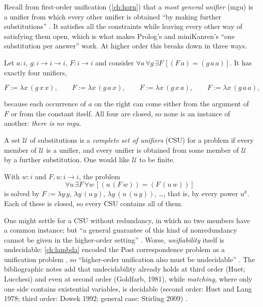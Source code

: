 Recall from first-order unification (\cref{ch:horn}) that a \emph{most general unifier} (mgu) is a unifier from
which every other unifier is obtained \enquote{by making further substitutions} . It satisfies all the
constraints while leaving every other way of satisfying them open, which is what makes Prolog's and
miniKanren's \enquote{one substitution per answer} work. At higher order this breaks down in three ways.

\begin{example}\label{ex:hounif-nomgu}
Let $a:i$, $g:i\to i\to i$, $F:i\to i$ and consider $\forall a\,\forall g\,\exists F\,[(F\,a)=(g\,a\,a)]$. It has
exactly four unifiers,
\begin{fullwidth}
\[
  F:=\lambda x\,(g\,x\,x),\qquad F:=\lambda x\,(g\,a\,x),\qquad F:=\lambda x\,(g\,x\,a),\qquad F:=\lambda x\,(g\,a\,a),
\]
\end{fullwidth}
because each occurrence of $a$ on the right can come either from the argument of $F$ or from the constant
itself. All four are closed, so none is an instance of another: \emph{there is no mgu}.
\end{example}

\begin{definition}
A set $\mathcal U$ of substitutions is a \emph{complete set of unifiers} (CSU) for a problem if every member of
$\mathcal U$ is a unifier, and every unifier is obtained from some member of $\mathcal U$ by a further
substitution. One would like $\mathcal U$ to be finite.
\end{definition}

\begin{example}\label{ex:hounif-infcsu}
With $w:i$ and $F,u:i\to i$, the problem
\[\forall u\,\exists F\,\forall w\,[(u\,(F\,w))=(F\,(u\,w))]\]
is solved by $F:=\lambda y\,y$, $\lambda y\,(u\,y)$, $\lambda y\,(u\,(u\,y))$, \dots, that is, by every power $u^k$. Each of these is
closed, so every CSU contains all of them.
\end{example}

One might settle for a CSU without redundancy, in which no two members have a common instance; but \enquote{a
general guarantee of this kind of nonredundancy cannot be given in the higher-order setting} . Worse,
\emph{unifiability} itself is undecidable: \cref{ch:lambda} encoded the Post correspondence problem as a
unification problem , so \enquote{higher-order unification also must be undecidable} . The
bibliographic notes add that undecidability already holds at third order (Huet; Lucchesi) and even at second
order (Goldfarb, 1981), while \emph{matching}, where only one side contains existential variables, is decidable
(second order: Huet and Lang 1978; third order: Dowek 1992; general case: Stirling 2009) .

